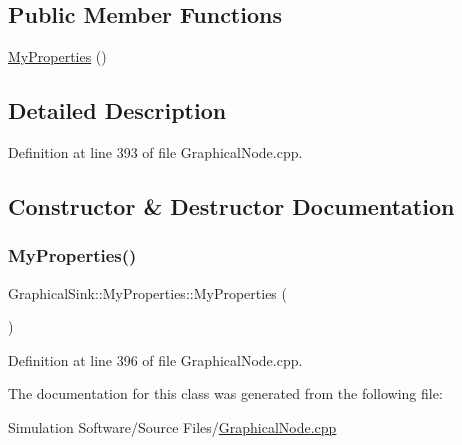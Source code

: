 \subsection*{Public Member Functions}
\begin{DoxyCompactItemize}
\item 
\hyperlink{class_graphical_sink_1_1_my_properties_a2814a47a530478b7a6be9e7541a3ae43}{My\+Properties} ()
\end{DoxyCompactItemize}


\subsection{Detailed Description}


Definition at line 393 of file Graphical\+Node.\+cpp.



\subsection{Constructor \& Destructor Documentation}
\mbox{\label{class_graphical_sink_1_1_my_properties_a2814a47a530478b7a6be9e7541a3ae43}} 
\subsubsection{\texorpdfstring{My\+Properties()}{MyProperties()}}
{\footnotesize\ttfamily Graphical\+Sink\+::\+My\+Properties\+::\+My\+Properties (\begin{DoxyParamCaption}{ }\end{DoxyParamCaption})\hspace{0.3cm}{\ttfamily [inline]}}



Definition at line 396 of file Graphical\+Node.\+cpp.



The documentation for this class was generated from the following file\+:\begin{DoxyCompactItemize}
\item 
Simulation Software/\+Source Files/\hyperlink{_graphical_node_8cpp}{Graphical\+Node.\+cpp}\end{DoxyCompactItemize}
